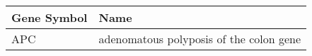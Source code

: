 \begin{tabular}{ll}
\toprule
Gene Symbol &                                    Name \\
\midrule
        APC & adenomatous polyposis of the colon gene \\
\bottomrule
\end{tabular}
